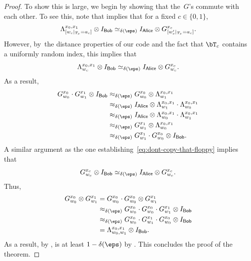 \documentclass[11pt]{article}
\newcommand{\reg}[1]{{\mathsf{#1}}}
\begin{document}
\begin{proof}
To show this is large, we begin by showing that the~$G$'s commute with each other.
To see this, note that  implies that for a fixed $c \in \{0, 1\}$,
\begin{equation*}
\Lambda^{x_0, x_1}_{[w_c|_{T_c} = a_c]} \otimes I_{\reg{Bob}}\simeq_{\delta(\eps)}
 I_{\reg{Alice}} \otimes G^{x_c}_{[w_c'|_{T_c} = a_c]}.
\end{equation*}
However, by~the distance properties of our code and the fact that $\bT_c$ contains a uniformly random index, this implies that
\begin{equation}\label{eq:dont-copy-that-floppy}
\Lambda^{x_0, x_1}_{w_c} \otimes I_{\reg{Bob}}\simeq_{\delta(\eps)}
 I_{\reg{Alice}} \otimes G^{x_c}_{w_c}.
\end{equation}
As a result,
\begin{align*}
G^{x_0}_{w_0} \cdot G^{x_1}_{w_1} \otimes I_{\reg{Bob}}
&\approx_{\delta(\eps)} G^{x_0}_{w_0} \otimes \Lambda^{x_0, x_1}_{w_1}\\
&\approx_{\delta(\eps)} I_{\reg{Alice}} \otimes \Lambda^{x_0, x_1}_{w_1}\cdot \Lambda^{x_0, x_1}_{w_0}\\
&\approx_{\delta(\eps)} I_{\reg{Alice}} \otimes \Lambda^{x_0, x_1}_{w_0}\cdot \Lambda^{x_0, x_1}_{w_1}\\
&\approx_{\delta(\eps)} G^{x_1}_{w_1} \otimes \Lambda^{x_0, x_1}_{w_0}\\
&\approx_{\delta(\eps)}  G^{x_1}_{w_1} \cdot G^{x_0}_{w_0} \otimes I_{\reg{Bob}}.
\end{align*}
A similar argument as the one establishing~\eqref{eq:dont-copy-that-floppy} implies that
\begin{equation*}
G^{x_c}_{w_c} \otimes I_{\reg{Bob}}\simeq_{\delta(\eps)}
 I_{\reg{Alice}} \otimes G^{x_c}_{w_c}.
\end{equation*}
Thus,
\begin{align*}
G^{x_0}_{w_0} \otimes G^{x_1}_{w_1}
&= G^{x_0}_{w_0} \cdot G^{x_0}_{w_0} \otimes G^{x_1}_{w_1}\\
&\approx_{\delta(\eps)} G^{x_0}_{w_0} \cdot G^{x_0}_{w_0} \cdot G^{x_1}_{w_1} \otimes I_{\reg{Bob}}\\
&\approx_{\delta(\eps)} G^{x_0}_{w_0} \cdot G^{x_1}_{w_1} \cdot G^{x_0}_{w_0} \otimes I_{\reg{Bob}}\\
&= \Lambda^{x_0, x_1}_{w_0, w_1} \otimes I_{\reg{Bob}}.
\end{align*}
As a result, by ,   is at least $1-\delta(\eps)$ by .
This concludes the proof of the theorem.
\end{proof}
\end{document}
